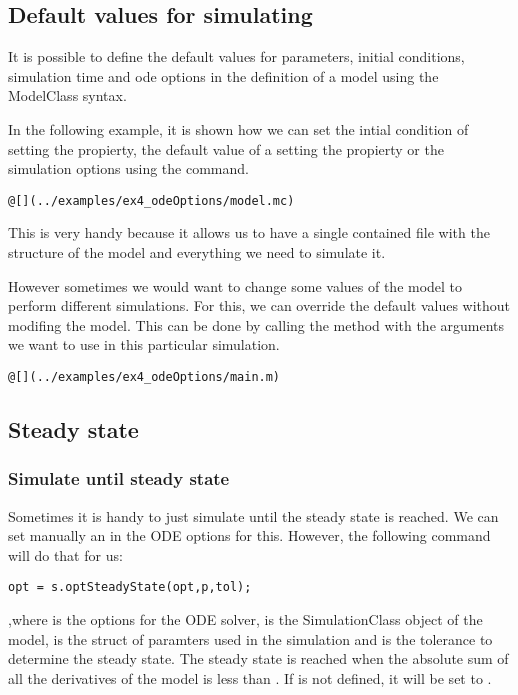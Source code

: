 \documentclass[11pt]{article}
\begin{document}
\subsection{Default values for simulating}

It is possible to define the default values for parameters, initial conditions, simulation time and ode options in the definition of a model using the ModelClass syntax.

In the following example, it is shown how we can set the intial condition of  setting the  propierty, the default value of a  setting the  propierty or the simulation options using the  command.

\begin{lstlisting}
@[](../examples/ex4_odeOptions/model.mc)
\end{lstlisting}

This is very handy because it allows us to have a single contained file with the structure of the model and everything we need to simulate it.

However sometimes we would want to change some values of the model to perform different simulations.
For this, we can override the default values without modifing the model. This can be done by calling the  method with the arguments we want to use in this particular simulation.

\begin{lstlisting}
@[](../examples/ex4_odeOptions/main.m)
\end{lstlisting}

\subsection{Steady state}

\subsubsection{Simulate until steady state}

Sometimes it is handy to just simulate until the steady state is reached. We can set manually an  in the ODE options for this. However, the following command will do that for us:

\begin{lstlisting}
opt = s.optSteadyState(opt,p,tol);
\end{lstlisting}

,where  is the options for the ODE solver,  is the SimulationClass object of the model,  is the struct of paramters used in the simulation and  is the tolerance to determine the steady state. The steady state is reached when the absolute sum of all the derivatives of the model is less than . If  is not defined, it will be set to .
\end{document}
